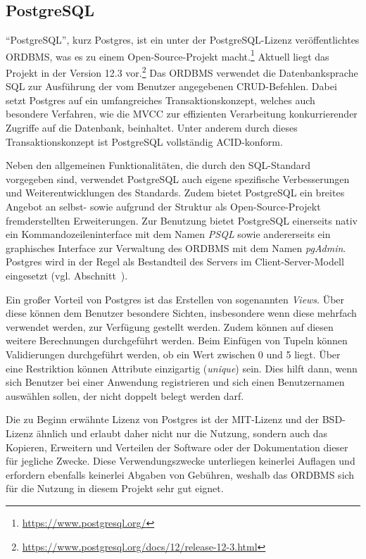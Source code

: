 \subsection{PostgreSQL}
\label{ssec:PostgreSQL}

\enquote{PostgreSQL}, kurz Postgres, ist ein unter der PostgreSQL-Lizenz\autocite{rf-psqllicense} veröffentlichtes \ac{ORDBMS}, was es zu einem Open-Source-Projekt macht.\footnote{\url{https://www.postgresql.org/}}
Aktuell liegt das Projekt in der Version 12.3 vor.\footnote{\url{https://www.postgresql.org/docs/12/release-12-3.html}}
Das \ac{ORDBMS} verwendet die Datenbanksprache \ac{SQL} zur Ausführung der vom Benutzer angegebenen \ac{CRUD}-Befehlen.
Dabei setzt Postgres auf ein umfangreiches Transaktionskonzept, welches auch besondere Verfahren, wie die \ac{MVCC} zur effizienten Verarbeitung konkurrierender Zugriffe auf die Datenbank, beinhaltet.
Unter anderem durch dieses Transaktionskonzept ist PostgreSQL vollständig \ac{ACID}-konform.\autocite[Vgl.][]{rf-psqlfeatures}

Neben den allgemeinen Funktionalitäten, die durch den \ac{SQL}-Standard vorgegeben sind, verwendet PostgreSQL auch eigene spezifische Verbesserungen und Weiterentwicklungen des Standards.
Zudem bietet PostgreSQL ein breites Angebot an selbst- sowie aufgrund der Struktur als Open-Source-Projekt fremderstellten Erweiterungen.
Zur Benutzung bietet PostgreSQL einerseits nativ ein Kommandozeileninterface mit dem Namen \emph{PSQL} sowie andererseits ein graphisches Interface zur Verwaltung des \ac{ORDBMS} mit dem Namen \emph{pgAdmin}.
Postgres wird in der Regel als Bestandteil des Servers im Client-Server-Modell eingesetzt (vgl. Abschnitt~).

Ein großer Vorteil von Postgres ist das Erstellen von sogenannten \emph{Views}.
Über diese können dem Benutzer besondere Sichten, insbesondere wenn diese mehrfach verwendet werden, zur Verfügung gestellt werden.
Zudem können auf diesen weitere Berechnungen durchgeführt werden.
Beim Einfügen von Tupeln können Validierungen durchgeführt werden, \zb ob ein Wert zwischen 0 und 5 liegt.
Über eine Restriktion  können Attribute einzigartig (\emph{unique}) sein.
Dies hilft \ua dann, wenn sich Benutzer bei einer Anwendung registrieren und sich einen Benutzernamen auswählen sollen, der nicht doppelt belegt werden darf.

Die zu Beginn erwähnte Lizenz von Postgres ist der MIT-Lizenz und der BSD-Lizenz ähnlich und erlaubt daher nicht nur die Nutzung, sondern auch das Kopieren, Erweitern und Verteilen der Software oder der Dokumentation dieser für jegliche Zwecke.
Diese Verwendungszwecke unterliegen keinerlei Auflagen und erfordern ebenfalls keinerlei Abgaben von Gebühren, weshalb das \ac{ORDBMS} sich für die Nutzung in diesem Projekt sehr gut eignet.\autocite[Vgl.][]{rf-psqllicense}
